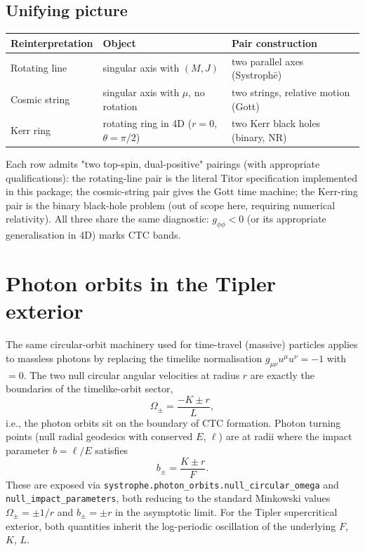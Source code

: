 \documentclass[11pt,a4paper]{article}
\begin{document}
\subsection{Unifying picture}

\begin{center}
\begin{tabular}{lll}
\toprule
Reinterpretation & Object & Pair construction \\
\midrule
Rotating line   & singular axis with $(M, J)$ & two parallel axes (Systroph\=e) \\
Cosmic string   & singular axis with $\mu$, no rotation & two strings, relative motion (Gott) \\
Kerr ring       & rotating ring in 4D ($r = 0$, $\theta = \pi/2$) & two Kerr black holes (binary, NR) \\
\bottomrule
\end{tabular}
\end{center}

Each row admits "two top-spin, dual-positive" pairings (with
appropriate qualifications): the rotating-line pair is the literal
Titor specification implemented in this package; the cosmic-string
pair gives the Gott time machine; the Kerr-ring pair is the binary
black-hole problem (out of scope here, requiring numerical
relativity). All three share the same diagnostic: $g_{\phi\phi} < 0$
(or its appropriate generalisation in 4D) marks CTC bands.

\section{Photon orbits in the Tipler exterior}
\label{sec:photons}

The same circular-orbit machinery used for time-travel (massive)
particles applies to massless photons by replacing the timelike
normalisation $g_{\mu\nu} u^\mu u^\nu = -1$ with $= 0$. The two null
circular angular velocities at radius $r$ are exactly the boundaries
of the timelike-orbit sector,
\begin{equation}
\Omega_\pm = \frac{-K \pm r}{L},
\end{equation}
i.e., the photon orbits sit on the boundary of CTC formation. Photon
turning points (null radial geodesics with conserved $E$, $\ell$) are
at radii where the impact parameter $b = \ell / E$ satisfies
\begin{equation}
b_\pm = \frac{K \pm r}{F}.
\end{equation}
These are exposed via \texttt{systrophe.photon\_orbits.null\_circular\_omega}
and \texttt{null\_impact\_parameters}, both reducing to the standard
Minkowski values $\Omega_\pm = \pm 1/r$ and $b_\pm = \pm r$ in the
asymptotic limit. For the Tipler supercritical exterior, both quantities
inherit the log-periodic oscillation of the underlying $F$, $K$, $L$.
\end{document}
